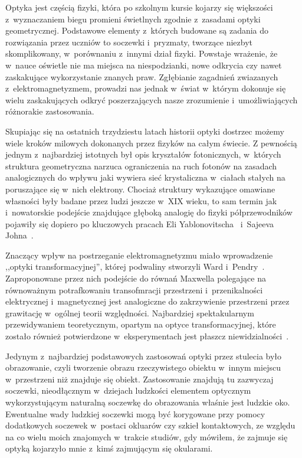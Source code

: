 Optyka jest częścią fizyki, która po szkolnym kursie kojarzy się większości z~wyznaczaniem biegu promieni świetlnych zgodnie z~zasadami optyki geometrycznej. Podstawowe elementy z~których budowane są zadania do rozwiązania przez uczniów to soczewki i~pryzmaty, tworzące niezbyt skomplikowany, w~porównaniu z~innymi dział fizyki. Powstaje wrażenie, że w~nauce oświetle nie ma miejsca na niespodzianki, nowe odkrycia czy nawet zaskakujące wykorzystanie znanych praw. Zgłębianie zagadnień zwiazanych z~elektromagnetyzmem, prowadzi nas jednak w~świat w~którym dokonuje się wielu zaskakujących odkryć poszerzających nasze zrozumienie i~umożliwiających różnorakie zastosowania.

Skupiając się na ostatnich trzydziestu latach historii optyki dostrzec możemy wiele kroków milowych dokonanych przez fizyków na całym świecie. Z pewnością jednym z~najbardziej istotnych był opis kryształów fotonicznych, w~których struktura geometryczna narzuca ograniczenia na ruch fotonów na zasadach analogicznych do wpływu jaki wywiera sieć krystaliczna w~ciałach stałych na poruszające się w~nich elektrony. Chociaż struktury wykazujące omawiane własności były badane przez ludzi jeszcze w~XIX wieku, to sam termin jak i~nowatorskie podejście znajdujące głęboką analogię do fizyki półprzewodników pojawiły się dopiero po kluczowych pracach Eli Yablonovitscha~\cite{yablonovitch1987inhibited} i~Sajeeva Johna~\cite{john1987strong}.

Znaczący wpływ na postrzeganie elektromagnetyzmu miało wprowadzenie ,,optyki transformacyjnej'', której podwaliny stworzyli Ward i~Pendry~\cite{ward1996refraction}. Zaproponowane  przez nich podejście do równań Maxwella polegające na równoważnym potrafkowaniu transofmracji przestrzeni i~przenikalności elektrycznej i~magnetycznej jest analogiczne do zakrzywienie przestrzeni przez grawitację w~ogólnej teorii względności. Najbardziej spektakularnym przewidywaniem teoretycznym, opartym na optyce transformacyjnej, które zostało również potwierdzone w~eksperymentach jest płaszcz niewidzialności~\cite{schurig2006metamaterial}.

Jedynym z~najbardziej podstawowych zastosowań optyki przez stulecia było obrazowanie, czyli tworzenie obrazu rzeczywistego obiektu w~innym miejscu w~przestrzeni niż znajduje się obiekt. Zastosowanie znajdują tu zazwyczaj soczewki, nieodłącznym w~dziejach ludzkości elementem optycznym wykorzystującym naturalną soczewkę do obrazowania właśnie jest ludzkie oko. Ewentualne wady ludzkiej soczewki mogą być korygowane przy pomocy dodatkowych soczewek w~postaci okluarów czy szkieł kontaktowych, ze względu na co wielu moich znajomych w~trakcie studiów, gdy mówiłem, że zajmuje się optyką kojarzyło mnie z~kimś zajmującym się okularami.

